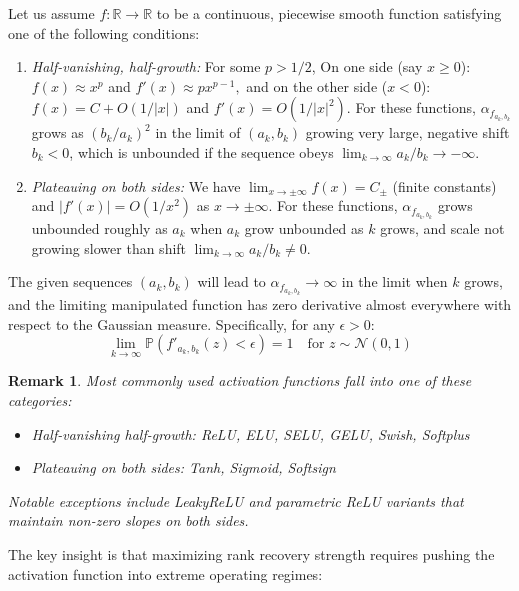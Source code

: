 \documentclass{article}
\newtheorem{remark}{Remark}[section]
\numberwithin{figure}{section}
\begin{document}
Let us assume $f:\mathbb{R}\to\mathbb{R}$ to be a continuous, piecewise smooth function satisfying one of the following conditions:
\begin{enumerate}
    \item \emph{Half-vanishing, half-growth:} For some $p > 1/2$, On one side (say $x \geq 0$): $f(x) \approx x^p$ and $f'(x) \approx px^{p-1},$ and on the other side ($x < 0$): $f(x) = C + O(1/|x|)$ and $f'(x) = O(1/|x|^2)$. 
    For these functions, $\alpha_{f_{a_k,b_k}}$ grows  as $(b_k/a_k)^2$ in the limit of $(a_k,b_k) $ growing very large, negative shift $b_k < 0$, which is unbounded if the sequence obeys $\lim_{k\to\infty} a_k/b_k \to -\infty$. 
    
    \item \emph{Plateauing on both sides:} We have $\lim_{x \to \pm\infty} f(x) = C_{\pm}$ (finite constants) and $|f'(x)| = O(1/x^2)$ as $x \to \pm\infty.$
    For these functions, $\alpha_{f_{a_k,b_k}}$ grows unbounded roughly as $a_k$ when $a_k$ grow unbounded as $k$ grows, and scale not growing slower than shift $\lim_{k\to\infty} a_k/b_k \neq 0 .$
\end{enumerate}

The given sequences $(a_k, b_k)$  will lead to $\alpha_{f_{a_k,b_k}} \to \infty$ in the limit when $k$ grows, and the limiting manipulated function has zero derivative almost everywhere with respect to the Gaussian measure. Specifically, for any $\epsilon > 0$:
$$\lim_{k \to \infty} \mathbb{P}(f'_{a_k,b_k}(z) < \epsilon) = 1 \quad \text{for } z \sim \mathcal{N}(0,1)$$

\begin{remark}
Most commonly used activation functions fall into one of these categories:
\begin{itemize}
    \item \emph{Half-vanishing half-growth:} ReLU, ELU, SELU, GELU, Swish, Softplus
    \item \emph{Plateauing on both sides:} Tanh, Sigmoid, Softsign
\end{itemize}
Notable exceptions include LeakyReLU and parametric ReLU variants that maintain non-zero slopes on both sides.
\end{remark}



The key insight is that maximizing rank recovery strength requires pushing the activation function into extreme operating regimes:
\end{document}
